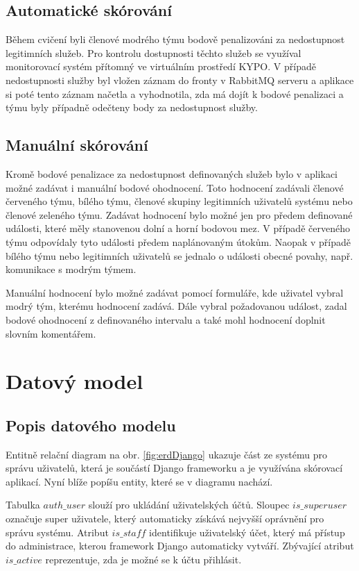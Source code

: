 \documentclass[
  digital, %
  twoside, %
  table,   %
  lof,     %
  lot,     %
]{fithesis3}
\begin{document}
\subsection{Automatické skórování}
Během cvičení byli členové modrého týmu bodově penalizováni za nedostupnost legitimních služeb. Pro kontrolu dostupnosti těchto služeb se využíval monitorovací systém přítomný ve virtuálním prostředí KYPO. V případě nedostupnosti služby byl vložen záznam do fronty v RabbitMQ serveru a aplikace si poté tento záznam načetla a vyhodnotila, zda má dojít k bodové penalizaci a týmu byly případně odečteny body za nedostupnost služby.
\subsection{Manuální skórování}
Kromě bodové penalizace za nedostupnost definovaných služeb bylo v aplikaci možné zadávat i manuální bodové ohodnocení. Toto hodnocení zadávali členové červeného týmu, bílého týmu, členové skupiny legitimních uživatelů systému nebo členové zeleného týmu. Zadávat hodnocení bylo možné jen pro předem definované události, které měly stanovenou dolní a horní bodovou mez. V případě červeného týmu odpovídaly tyto události předem naplánovaným útokům. Naopak v případě bílého týmu nebo legitimních uživatelů se jednalo o události obecné povahy, např. komunikace s modrým týmem.

Manuální hodnocení bylo možné zadávat pomocí formuláře, kde uživatel vybral modrý tým, kterému hodnocení zadává. Dále vybral požadovanou událost, zadal bodové ohodnocení z definovaného intervalu a také mohl hodnocení doplnit slovním komentářem.

\section{Datový model}
\subsection{Popis datového modelu}

Entitně relační diagram na obr. \ref{fig:erdDjango} ukazuje část ze systému pro správu uživatelů, která je součástí Django frameworku a je využívána skórovací aplikací. Nyní blíže popíšu entity, které se v diagramu nachází.

Tabulka $auth\_user$ slouží pro ukládání uživatelských účtů. Sloupec $is\_superuser$ označuje super uživatele, který automaticky získává nejvyšší oprávnění pro správu systému. Atribut $is\_staff$ identifikuje uživatelský účet, který má přístup do administrace, kterou framework Django automaticky vytváří. Zbývající atribut $is\_active$ reprezentuje, zda je možné se k účtu přihlásit.
\end{document}

